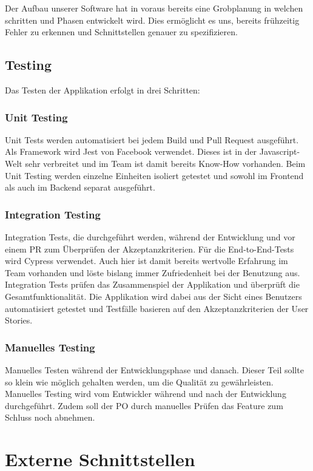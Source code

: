 \documentclass[a4paper, 11pt]{scrartcl}
\let\oldsection\section
\renewcommand\section{\clearpage\oldsection}
\begin{document}
Der Aufbau unserer Software hat in voraus bereits eine Grobplanung in welchen schritten und Phasen entwickelt wird.
Dies ermöglicht es uns, bereits frühzeitig Fehler zu erkennen und Schnittstellen genauer zu spezifizieren.

\subsection{Testing}
Das Testen der Applikation erfolgt in drei Schritten:

\subsubsection{Unit Testing}
Unit Tests werden automatisiert bei jedem Build und Pull Request ausgeführt.
Als Framework wird Jest von Facebook verwendet. Dieses ist in der Javascript-Welt sehr verbreitet und im Team ist damit bereits Know-How vorhanden.
Beim Unit Testing werden einzelne Einheiten isoliert getestet und sowohl im Frontend als auch im Backend separat ausgeführt.

\subsubsection{Integration Testing}
Integration Tests, die durchgeführt werden, während der Entwicklung und vor einem PR zum Überprüfen der Akzeptanzkriterien.
Für die End-to-End-Tests wird Cypress verwendet. Auch hier ist damit bereits wertvolle Erfahrung im Team vorhanden
und löste bislang immer Zufriedenheit bei der Benutzung aus.
Integration Tests prüfen das Zusammenspiel der Applikation und überprüft die Gesamtfunktionalität.
Die Applikation wird dabei aus der Sicht eines Benutzers automatisiert getestet und Testfälle basieren
auf den Akzeptanzkriterien der User Stories.

\subsubsection{Manuelles Testing}
Manuelles Testen während der Entwicklungsphase und danach. Dieser Teil sollte so klein wie möglich gehalten werden, um die Qualität zu gewährleisten. Manuelles Testing wird vom Entwickler während und nach der Entwicklung durchgeführt.
Zudem soll der PO durch manuelles Prüfen das Feature zum Schluss noch abnehmen.

\section{Externe Schnittstellen}
\end{document}
